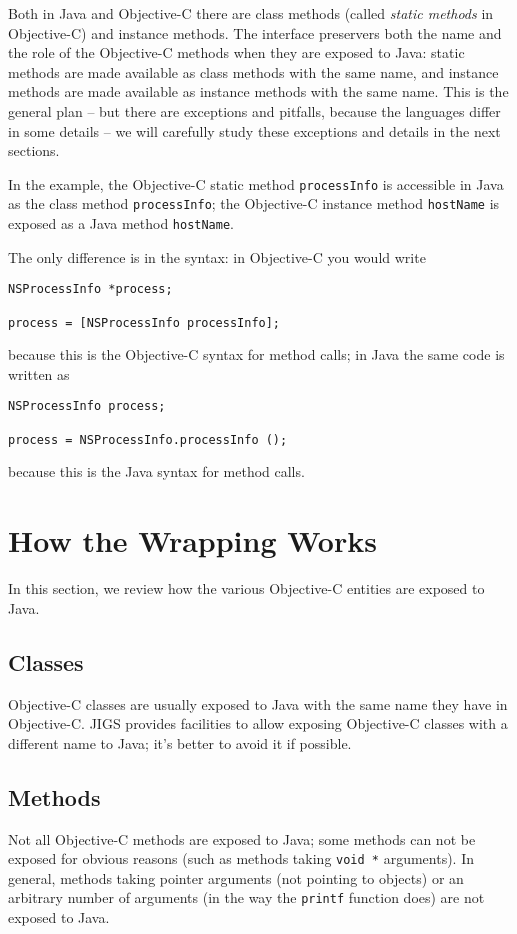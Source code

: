 Both in Java and Objective-C there are class methods (called {\sl static
methods} in Objective-C) and instance methods.  The interface
preservers both the name and the role of the Objective-C methods when
they are exposed to Java: static methods are made available as class
methods with the same name, and instance methods are made available as
instance methods with the same name.  This is the general plan -- but
there are exceptions and pitfalls, because the languages differ in
some details -- we will carefully study these exceptions and details
in the next sections.

In the example, the Objective-C static method \texttt{processInfo} is
accessible in Java as the class method \texttt{processInfo}; the
Objective-C instance method \texttt{hostName} is exposed as a Java
method \texttt{hostName}.

The only difference is in the syntax: in Objective-C you would write
\begin{verbatim}
NSProcessInfo *process;

process = [NSProcessInfo processInfo];
\end{verbatim}
because this is the Objective-C syntax for method calls; in Java the 
same code is written as 
\begin{verbatim}
NSProcessInfo process;

process = NSProcessInfo.processInfo ();
\end{verbatim}
because this is the Java syntax for method calls.

\section{How the Wrapping Works}

In this section, we review how the various Objective-C entities are
exposed to Java.

\subsection{Classes}
Objective-C classes are usually exposed to Java with the same name
they have in Objective-C.  JIGS provides facilities to allow exposing
Objective-C classes with a different name to Java; it's better to
avoid it if possible.

\subsection{Methods}
Not all Objective-C methods are exposed to Java; some methods can not
be exposed for obvious reasons (such as methods taking \texttt{void *}
arguments).  In general, methods taking pointer arguments (not
pointing to objects) or an arbitrary number of arguments (in the way 
the \texttt{printf} function does) are not exposed to Java.

